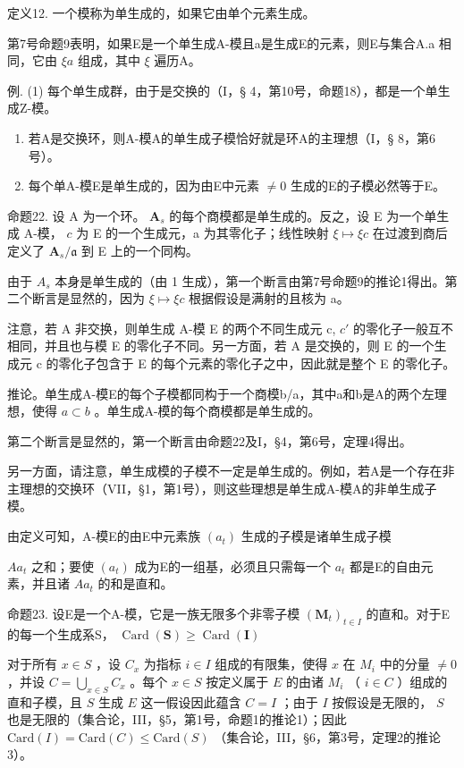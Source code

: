 定义12. 一个模称为单生成的，如果它由单个元素生成。

第7号命题9表明，如果E是一个单生成A-模且a是生成E的元素，则E与集合A.a 相同，它由 \(\xi a\) 组成，其中 \(\xi\) 遍历A。

例. (1) 每个单生成群，由于是交换的（I，§ 4，第10号，命题18），都是一个单生成Z-模。

\begin{enumerate}
\def\labelenumi{(\arabic{enumi})}
\setcounter{enumi}{1}
\item
  若A是交换环，则A-模A的单生成子模恰好就是环A的主理想（I，§ 8，第6号）。
\item
  每个单A-模E是单生成的，因为由E中元素 \(\neq0\) 生成的E的子模必然等于E。
\end{enumerate}

命题22. 设 A 为一个环。 \(\mathbf{A}_s\) 的每个商模都是单生成的。反之，设 E 为一个单生成 A-模， \(c\) 为 E 的一个生成元，a 为其零化子；线性映射 \(\xi \mapsto \xi c\) 在过渡到商后定义了 \(\mathbf{A}_s / \mathfrak{a}\) 到 E 上的一个同构。

由于 \(A_{s}\) 本身是单生成的（由 1 生成），第一个断言由第7号命题9的推论1得出。第二个断言是显然的，因为 \(\xi \mapsto \xi c\) 根据假设是满射的且核为 a。

注意，若 A 非交换，则单生成 A-模 E 的两个不同生成元 c, \(c'\) 的零化子一般互不相同，并且也与模 E 的零化子不同。另一方面，若 A 是交换的，则 E 的一个生成元 c 的零化子包含于 E 的每个元素的零化子之中，因此就是整个 E 的零化子。

推论。单生成A-模E的每个子模都同构于一个商模b/a，其中a和b是A的两个左理想，使得 \(a \subset b\) 。单生成A-模的每个商模都是单生成的。

第二个断言是显然的，第一个断言由命题22及I，§4，第6号，定理4得出。

另一方面，请注意，单生成模的子模不一定是单生成的。例如，若A是一个存在非主理想的交换环（VII，§1，第1号），则这些理想是单生成A-模A的非单生成子模。

由定义可知，A-模E的由E中元素族 \((a_{t})\) 生成的子模是诸单生成子模

\(Aa_{t}\) 之和；要使 \((a_{t})\) 成为E的一组基，必须且只需每一个 \(a_{t}\) 都是E的自由元素，并且诸 \(Aa_{t}\) 的和是直和。

命题23. 设E是一个A-模，它是一族无限多个非零子模 \((\mathbf{M}_t)_{t\in I}\) 的直和。对于E的每一个生成系S， \(\operatorname{Card}(\mathbf{S})\geqslant \operatorname{Card}(\mathbf{I})\)

对于所有 \(x \in S\) ，设 \(C_x\) 为指标 \(i \in I\) 组成的有限集，使得 \(x\) 在 \(M_i\) 中的分量 \(\neq 0\) ，并设 \(C = \bigcup_{x \in S} C_x\) 。每个 \(x \in S\) 按定义属于 \(E\) 的由诸 \(M_i\) （ \(i \in C\) ）组成的直和子模，且 \(S\) 生成 \(E\) 这一假设因此蕴含 \(C = I\) ；由于 \(I\) 按假设是无限的， \(S\) 也是无限的（集合论，III，§5，第1号，命题1的推论1）；因此 \(\text{Card}(I) = \text{Card}(C) \leqslant \text{Card}(S)\) （集合论，III，§6，第3号，定理2的推论3）。

